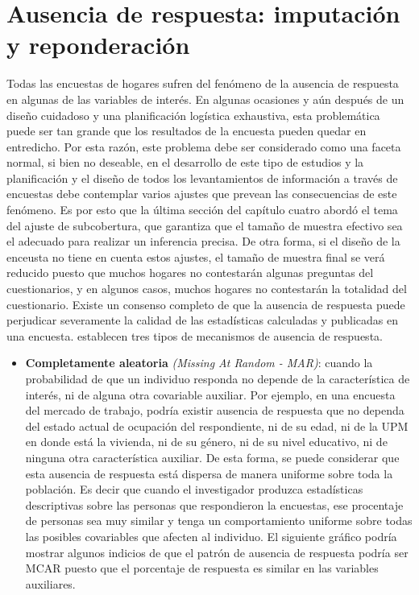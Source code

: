 \documentclass[12pt,spanish,]{book}
\providecommand{\tightlist}{%
  \setlength{\itemsep}{0pt}\setlength{\parskip}{0pt}}
\begin{document}
\hypertarget{ausencia-de-respuesta-imputacion-y-reponderacion}{%
\chapter{Ausencia de respuesta: imputación y reponderación}\label{ausencia-de-respuesta-imputacion-y-reponderacion}}

Todas las encuestas de hogares sufren del fenómeno de la ausencia de respuesta en algunas de las variables de interés. En algunas ocasiones y aún después de un diseño cuidadoso y una planificación logística exhaustiva, esta problemática puede ser tan grande que los resultados de la encuesta pueden quedar en entredicho. Por esta razón, este problema debe ser considerado como una faceta normal, si bien no deseable, en el desarrollo de este tipo de estudios y la planificación y el diseño de todos los levantamientos de información a través de encuestas debe contemplar varios ajustes que prevean las consecuencias de este fenómeno. Es por esto que la última sección del capítulo cuatro abordó el tema del ajuste de subcobertura, que garantiza que el tamaño de muestra efectivo sea el adecuado para realizar un inferencia precisa. De otra forma, si el diseño de la enceusta no tiene en cuenta estos ajustes, el tamaño de muestra final se verá reducido puesto que muchos hogares no contestarán algunas preguntas del cuestionarios, y en algunos casos, muchos hogares no contestarán la totalidad del cuestionario. Existe un consenso completo de que la ausencia de respuesta puede perjudicar severamente la calidad de las estadísticas calculadas y publicadas en una encuesta. \textcite{Little_Rubin_2002} establecen tres tipos de mecanismos de ausencia de respuesta.

\begin{itemize}
\tightlist
\item
  \textbf{Completamente aleatoria} \emph{(Missing At Random - MAR)}: cuando la probabilidad de que un individuo responda no depende de la característica de interés, ni de alguna otra covariable auxiliar. Por ejemplo, en una encuesta del mercado de trabajo, podría existir ausencia de respuesta que no dependa del estado actual de ocupación del respondiente, ni de su edad, ni de la UPM en donde está la vivienda, ni de su género, ni de su nivel educativo, ni de ninguna otra característica auxiliar. De esta forma, se puede considerar que esta ausencia de respuesta está dispersa de manera uniforme sobre toda la población. Es decir que cuando el investigador produzca estadísticas descriptivas sobre las personas que respondieron la encuestas, ese procentaje de personas sea muy similar y tenga un comportamiento uniforme sobre todas las posibles covariables que afecten al individuo. El siguiente gráfico podría mostrar algunos indicios de que el patrón de ausencia de respuesta podría ser MCAR puesto que el porcentaje de respuesta es similar en las variables auxiliares.
\end{itemize}
\end{document}
